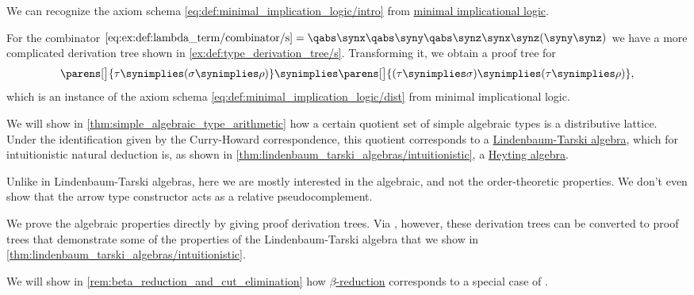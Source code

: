 \begin{example}
\begin{thmenum}
    We can recognize the axiom schema \eqref{eq:def:minimal_implication_logic/intro} from \hyperref[def:minimal_implication_logic]{minimal implicational logic}.

    For the combinator \( \ref{eq:ex:def:lambda_term/combinator/s} = \qabs \synx \qabs \syny \qabs \synz \synx \synz (\syny \synz) \) we have a more complicated derivation tree shown in \cref{ex:def:type_derivation_tree/s}. Transforming it, we obtain a proof tree for
    \begin{equation*}
      \parens[\big]{ \tau \synimplies (\sigma \synimplies \rho) } \synimplies \parens[\big]{ (\tau \synimplies \sigma) \synimplies (\tau \synimplies \rho)},
    \end{equation*}
    which is an instance of the axiom schema \eqref{eq:def:minimal_implication_logic/dist} from minimal implicational logic.

     We will show in \cref{thm:simple_algebraic_type_arithmetic} how a certain quotient set of simple algebraic types is a distributive lattice. Under the identification given by the Curry-Howard correspondence, this quotient corresponds to a \hyperref[def:lindenbaum_tarski_algebra]{Lindenbaum-Tarski algebra}, which for intuitionistic natural deduction is, as shown in \cref{thm:lindenbaum_tarski_algebras/intuitionistic}, a \hyperref[def:heyting_algebra]{Heyting algebra}.

    Unlike in Lindenbaum-Tarski algebras, here we are mostly interested in the algebraic, and not the order-theoretic properties. We don't even show that the arrow type constructor acts as a relative pseudocomplement.

    We prove the algebraic properties directly by giving proof derivation trees. Via , however, these derivation trees can be converted to proof trees that demonstrate some of the properties of the Lindenbaum-Tarski algebra that we show in \cref{thm:lindenbaum_tarski_algebras/intuitionistic}.

     We will show in \cref{rem:beta_reduction_and_cut_elimination} how \hyperref[def:beta_eta_reduction]{\( \beta \)-reduction} corresponds to a special case of .
  \end{thmenum}
\end{example}
